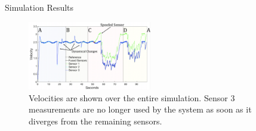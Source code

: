 \begin{section}{Simulation Results}









\begin{figure}[ht!]
\centering
\includegraphics[width=0.48\textwidth]{Figures/Velocities.png}
\caption{Velocities are shown over the entire simulation. Sensor 3 measurements are no longer used by the system as soon as it diverges from the remaining sensors. }
\label{fig:total_velocity}
\end{figure}



\end{section}
